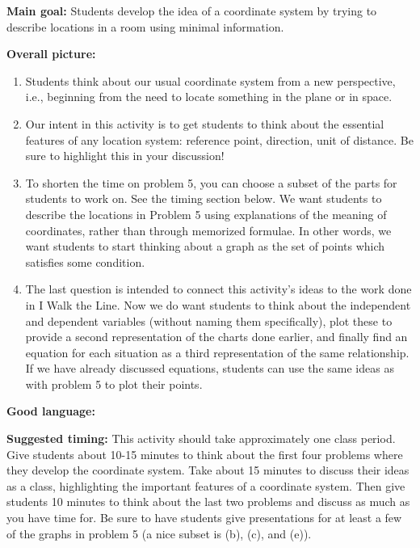 \documentclass[nooutcomes] {ximera}
\begin{document}
\pagebreak

\begin{instructorNotes}

{\bf Main goal:} Students develop the idea of a coordinate system by trying to describe locations in a room using minimal information.


{\bf Overall picture:}


\begin{enumerate}
\item Students think about our usual coordinate system from a new perspective, i.e., beginning from the need to locate something in the plane or in space.
\item  Our intent in this activity is to get students to think about the essential features of any location system: reference point, direction, unit of distance. Be sure to highlight this in your discussion!
\item To shorten the time on problem 5, you can choose a subset of the parts for students to work on. See the timing section below. We want students to describe the locations in Problem 5 using explanations of the meaning of coordinates, rather than through memorized formulae. In other words, we want students to start thinking about a graph as the set of points which satisfies some condition.
\item  The last question is intended to connect this activity's ideas to the work done in I Walk the Line.  Now we do want students to think about the independent and dependent variables (without naming them specifically), plot these to provide a second representation of the charts done earlier, and finally find an equation for each situation as a third representation of the same relationship. If we have already discussed equations, students can use the same ideas as with problem 5 to plot their points.
\end{enumerate}





{\bf Good language:}


{\bf Suggested timing:} This activity should take approximately one class period. Give students about 10-15 minutes to think about the first four problems where they develop the coordinate system. Take about 15 minutes to discuss their ideas as a class, highlighting the important features of a coordinate system. Then give students 10 minutes to think about the last two problems and discuss as much as you have time for. Be sure to have students give presentations for at least a few of the graphs in problem 5 (a nice subset is (b), (c), and (e)).

\end{instructorNotes}
\end{document}
